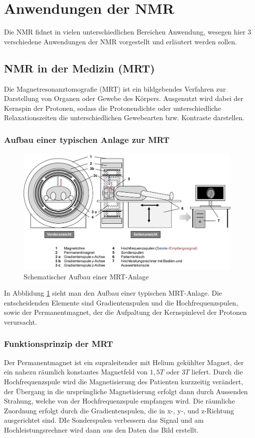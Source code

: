 \section{Anwendungen der NMR}
Die NMR fidnet in vielen unterschiedlichen Bereichen Anwendung, wesegen hier 3 verschiedene Anwendungen der NMR vorgestellt und erläutert werden sollen.

\subsection{NMR in der Medizin (MRT)}
Die Magnetresonanztomografie (MRT) ist ein bildgebendes Verfahren zur Darstellung von Organen oder Gewebe des Körpers. Ausgenutzt wird dabei der Kernspin der Protonen, sodass die Protonendichte oder unterschiedliche Relaxationszeiten die unterschiedlichen Gewebearten bzw. Kontraste darstellen.
\subsubsection*{Aufbau einer typischen Anlage zur MRT}
\begin{figure}[htbp] 
     \includegraphics[width=0.99\textwidth]{mrt_aufbau.png}
  \caption{Schematischer Aufbau einer MRT-Anlage \cite{mrt}}
  \label{mrt_aufbau}
\end{figure}
In Abblidung \ref{mrt_aufbau} sieht man den Aufbau einer typischen MRT-Anlage. Die entscheidenden Elemente sind Gradientenspulen und die Hochfrequenzspulen, sowie der Permanentmagnet, der die Aufpaltung der Kernspinlevel der Protonen verursacht.
\subsubsection*{Funktionsprinzip der MRT}
Der Permanentmagnet ist ein supraleitender mit Helium gekühlter Magnet, der ein nahezu räumlich konstantes Magnetfeld von $1,5T$ oder $3T$ liefert. Durch die Hochfrequenzspule wird die Magnetisierung des Patienten kurzzeitig verändert, der Übergang in die ursprüngliche Magnetisierung erfolgt dann durch Aussenden Strahung, welche von der Hochfrequenzspule empfangen wird. Die räumliche Zuordnung erfolgt durch die Gradientenspulen, die in x-, y-, und z-Richtung ausgerichtet sind. DIe Sonderspulen verbessern das Signal und am Hochleistungsrechner wird dann aus den Daten das Bild erstellt. 

